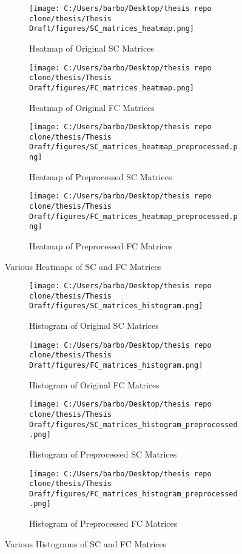 \begin{figure}[h!]
    \centering
    \begin{subfigure}[b]{0.45\textwidth}
        \texttt{[image: C:/Users/barbo/Desktop/thesis repo clone/thesis/Thesis Draft/figures/SC\_matrices\_heatmap.png]}
        \caption{Heatmap of Original SC Matrices}
    \end{subfigure}
    \begin{subfigure}[b]{0.45\textwidth}
        \texttt{[image: C:/Users/barbo/Desktop/thesis repo clone/thesis/Thesis Draft/figures/FC\_matrices\_heatmap.png]}
        \caption{Heatmap of Original FC Matrices}
    \end{subfigure}
    \begin{subfigure}[b]{0.45\textwidth}
        \texttt{[image: C:/Users/barbo/Desktop/thesis repo clone/thesis/Thesis Draft/figures/SC\_matrices\_heatmap\_preprocessed.png]}
        \caption{Heatmap of Preprocessed SC Matrices}
    \end{subfigure}
    \begin{subfigure}[b]{0.45\textwidth}
        \texttt{[image: C:/Users/barbo/Desktop/thesis repo clone/thesis/Thesis Draft/figures/FC\_matrices\_heatmap\_preprocessed.png]}
        \caption{Heatmap of Preprocessed FC Matrices}
    \end{subfigure}
    \caption{Various Heatmaps of SC and FC Matrices}
\end{figure}


\begin{figure}[h!]
    \centering
    \begin{subfigure}[b]{0.45\textwidth}
        \texttt{[image: C:/Users/barbo/Desktop/thesis repo clone/thesis/Thesis Draft/figures/SC\_matrices\_histogram.png]}
        \caption{Histogram of Original SC Matrices}
    \end{subfigure}
    \begin{subfigure}[b]{0.45\textwidth}
        \texttt{[image: C:/Users/barbo/Desktop/thesis repo clone/thesis/Thesis Draft/figures/FC\_matrices\_histogram.png]}
        \caption{Histogram of Original FC Matrices}
    \end{subfigure}
    \begin{subfigure}[b]{0.45\textwidth}
        \texttt{[image: C:/Users/barbo/Desktop/thesis repo clone/thesis/Thesis Draft/figures/SC\_matrices\_histogram\_preprocessed.png]}
        \caption{Histogram of Preprocessed SC Matrices}
    \end{subfigure}
    \begin{subfigure}[b]{0.45\textwidth}
        \texttt{[image: C:/Users/barbo/Desktop/thesis repo clone/thesis/Thesis Draft/figures/FC\_matrices\_histogram\_preprocessed.png]}
        \caption{Histogram of Preprocessed FC Matrices}
    \end{subfigure}
    
    \caption{Various Histograms of SC and FC Matrices}
\end{figure}


